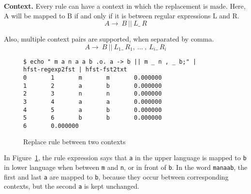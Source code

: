 \documentclass[draft]{llncs}
\begin{document}



\textbf{Context.} Every rule can have a context in which the replacement is made. 
Here, A will be mapped to B if and only if it is between regular expressions
L and R.
\begin{equation}
  A \rightarrow\ B\ ||\ L \_\  R
\end{equation}

Also, multiple context pairs are supported, when separated by comma.
\begin{equation}
  A \rightarrow\ B\ ||\ L_1 \_\  R_1 ,\ \ldots\ ,\ L_i \_\  R_i
\end{equation}

\begin{figure} [h!]
{\footnotesize
\begin{verbatim}
$ echo " m a n a a b .o. a -> b || m _ n , _ b;" |
hfst-regexp2fst | hfst-fst2txt
0       1       m       m       0.000000
1       2       a       b       0.000000
2       3       n       n       0.000000
3       4       a       a       0.000000
4       5       a       b       0.000000
5       6       b       b       0.000000
6       0.000000
\end{verbatim}
}
\caption{Replace rule between two contexts}
\label{fig:multiple_contexts}
\end{figure}

In Figure~\ref{fig:multiple_contexts}, the rule expression says that \verb!a! in the 
upper language is mapped to \verb!b! in lower language 
when between \verb!m! and \verb!n!, or in front of \verb!b!. 
In the word \verb!manaab!, the first and last \verb!a! are mapped to \verb!b!, 
because they occur between corresponding contexts, but the second \verb!a! is kept unchanged.
\end{document}
